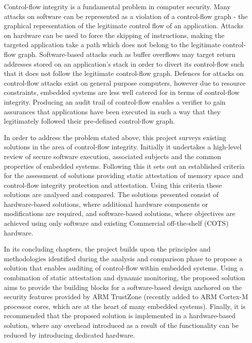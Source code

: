 Control-flow integrity is a fundamental problem in computer security. Many attacks on software can be represented as a violation of a control-flow graph - the graphical representation of the legitimate control flow of an application. Attacks on hardware can be used to force the skipping of instructions, making the targeted application take a path which does not belong to the legitimate control-flow graph. Software-based attacks such as buffer overflows may target return addresses stored on an application's stack in order to divert its control-flow such that it does not follow the legitimate control-flow graph. Defences for attacks on control-flow attacks exist on general purpose computers, however due to resource constraints, embedded systems are less well catered for in terms of control-flow integrity. Producing an audit trail of control-flow enables a verifier to gain assurances that applications have been executed in such a way that they legitimately followed their pre-defined control-flow graph.

In order to address the problem stated above, this project surveys existing solutions in the area of control-flow integrity. Initially it undertakes a high-level review of secure software execution, associated subjects and the common properties of embedded systems. Following this it sets out an established criteria for the assessment of solutions providing static attestation of memory space and control-flow integrity protection and attestation. Using this criteria these solutions are analysed and compared. The solutions presented consist of hardware-based solutions, where additional hardware components or modifications are required, and software-based solutions, where objectives are achieved using only software and existing Commercial off-the-shelf (COTS) hardware.

In its concluding chapters, the project builds upon the principles and methodologies identified during the analysis and comparison phase to propose a solution that enables auditing of control-flow within embedded systems. Using a combination of static attestation and dynamic monitoring, the proposed solution aims to provide the building blocks for a software-based design anchored on the security features provided by ARM TrustZone (recently added to ARM Cortex-M processor cores, which are at the heart of many embedded systems). Finally, it is recommended that the proposed solution is implemented in a hardware-based solution, where any overhead introduced as a result of the functionality can be reduced by introducing dedicated hardware.
